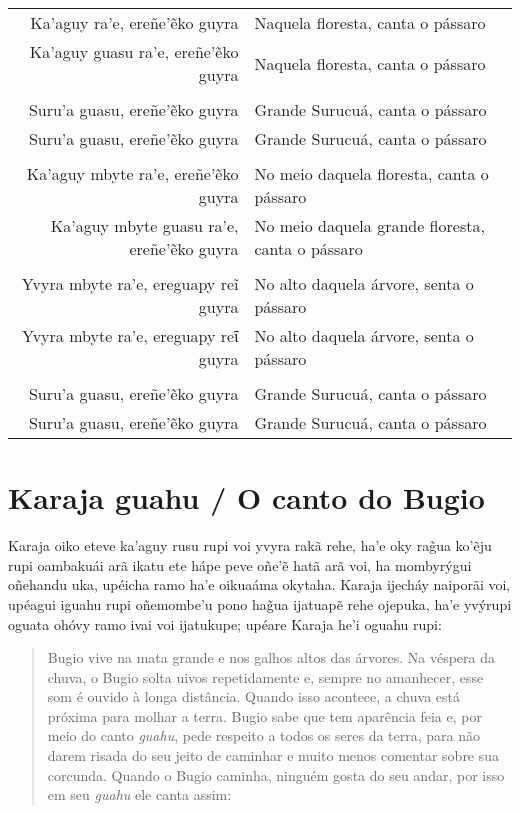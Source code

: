 \begin{table}[]
\begin{tabular}{rl}
Ka'aguy ra'e, ereñe'ẽko guyra          & Naquela floresta, canta o pássaro           \\
Ka'aguy guasu ra'e, ereñe'ẽko guyra          & Naquela floresta, canta o pássaro           \\
                  &                     \\
Suru'a guasu, ereñe'ẽko guyra          & Grande Surucuá, canta o pássaro           \\
Suru'a guasu, ereñe'ẽko guyra          & Grande Surucuá, canta o pássaro           \\
                  &                     \\
Ka'aguy mbyte ra'e, ereñe'ẽko guyra  & No meio daquela floresta, canta o pássaro           \\
Ka'aguy mbyte guasu ra'e, ereñe'ẽko guyra & No meio daquela grande floresta, canta o pássaro           \\
                  &                     \\
Yvyra mbyte ra'e, ereguapy reĩ guyra   & No alto daquela árvore, senta o pássaro           \\
Yvyra mbyte ra'e, ereguapy reῖ guyra   & No alto daquela árvore, senta o pássaro           \\
                  &                     \\
Suru'a guasu, ereñe'ẽko guyra          & Grande Surucuá, canta o pássaro           \\
Suru'a guasu, ereñe'ẽko guyra          & Grande Surucuá, canta o pássaro           \\
\end{tabular}
\end{table}

\chapter{Karaja guahu / O canto do Bugio}

Karaja oiko eteve ka'aguy rusu rupi voi yvyra rakã rehe, ha'e oky rag̃ua
ko'ẽju rupi oambakuái arã ikatu ete hápe peve oñe'ẽ hatã arã voi, ha
mombyrýgui oñehandu uka, upéicha ramo ha'e oikuaáma okytaha. Karaja
ijecháy naiporãi voi, upéagui iguahu rupi oñemombe'u pono hag̃ua ijatuapẽ
rehe ojepuka, ha'e yvýrupi oguata ohóvy ramo ivai voi ijatukupe; upéare
Karaja he'i oguahu rupi:

\begin{quote}
Bugio vive na mata grande e nos galhos altos das árvores. Na véspera da
chuva, o Bugio solta uivos repetidamente e, sempre no amanhecer, esse
som é ouvido à longa distância. Quando isso acontece, a chuva está
próxima para molhar a terra. Bugio sabe que tem aparência feia e, por
meio do canto \emph{guahu}, pede respeito a todos os seres da terra,
para não darem risada do seu jeito de caminhar e muito menos comentar
sobre sua corcunda. Quando o Bugio caminha, ninguém gosta do seu andar,
por isso em seu \emph{guahu} ele canta assim:
\end{quote}



